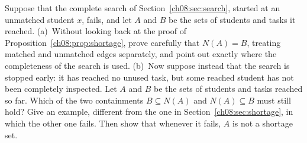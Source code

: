 \begin{exercise}\label{ex:8.6}Suppose that the complete search of Section~\ref{ch08:sec:search}, started at an unmatched student $x$, fails, and let $A$ and $B$ be the sets of students and tasks it reached. (a)~Without looking back at the proof of Proposition~\ref{ch08:prop:shortage}, prove carefully that $N(A)=B$, treating matched and unmatched edges separately, and point out exactly where the completeness of the search is used. (b)~Now suppose instead that the search is stopped early: it has reached no unused task, but some reached student has not been completely inspected. Let $A$ and $B$ be the sets of students and tasks reached so far. Which of the two containments $B\subseteq N(A)$ and $N(A)\subseteq B$ must still hold? Give an example, different from the one in Section~\ref{ch08:sec:shortage}, in which the other one fails. Then show that whenever it fails, $A$ is not a shortage set.\end{exercise}
